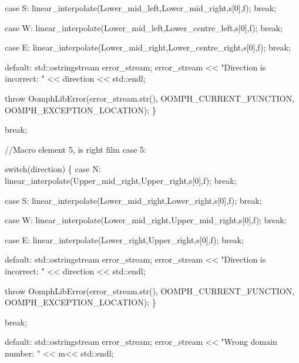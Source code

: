 \begin{DoxyCodeInclude}
     \textcolor{keywordflow}{case} S:  
       linear\_interpolate(Lower\_mid\_left,Lower\_mid\_right,s[0],f);
      \textcolor{keywordflow}{break};

     \textcolor{keywordflow}{case} W:
       linear\_interpolate(Lower\_mid\_left,Lower\_centre\_left,s[0],f);
      \textcolor{keywordflow}{break};

     \textcolor{keywordflow}{case} E:
       linear\_interpolate(Lower\_mid\_right,Lower\_centre\_right,s[0],f);
      \textcolor{keywordflow}{break};

     \textcolor{keywordflow}{default}:
      std::ostringstream error\_stream;
      error\_stream << \textcolor{stringliteral}{"Direction is incorrect: "} << direction << std::endl;

      \textcolor{keywordflow}{throw} OomphLibError(error\_stream.str(),
                          OOMPH\_CURRENT\_FUNCTION,
                          OOMPH\_EXCEPTION\_LOCATION);
     \}  

    \textcolor{keywordflow}{break};

    \textcolor{comment}{//Macro element 5, is right film}
   \textcolor{keywordflow}{case} 5:
    
    \textcolor{keywordflow}{switch}(direction)
     \{
     \textcolor{keywordflow}{case} N:
       linear\_interpolate(Upper\_mid\_right,Upper\_right,s[0],f);
      \textcolor{keywordflow}{break};
      
     \textcolor{keywordflow}{case} S:  
       linear\_interpolate(Lower\_mid\_right,Lower\_right,s[0],f);
      \textcolor{keywordflow}{break};

     \textcolor{keywordflow}{case} W:
       linear\_interpolate(Lower\_mid\_right,Upper\_mid\_right,s[0],f);
      \textcolor{keywordflow}{break};

     \textcolor{keywordflow}{case} E:
       linear\_interpolate(Lower\_right,Upper\_right,s[0],f);
      \textcolor{keywordflow}{break};

     \textcolor{keywordflow}{default}:
      std::ostringstream error\_stream;
      error\_stream << \textcolor{stringliteral}{"Direction is incorrect: "} << direction << std::endl;

      \textcolor{keywordflow}{throw} OomphLibError(error\_stream.str(),
                          OOMPH\_CURRENT\_FUNCTION,
                          OOMPH\_EXCEPTION\_LOCATION);
     \}

    \textcolor{keywordflow}{break};
    
   \textcolor{keywordflow}{default}:
    std::ostringstream error\_stream;
      error\_stream << \textcolor{stringliteral}{"Wrong domain number: "} << m<< std::endl;


\end{DoxyCodeInclude}
